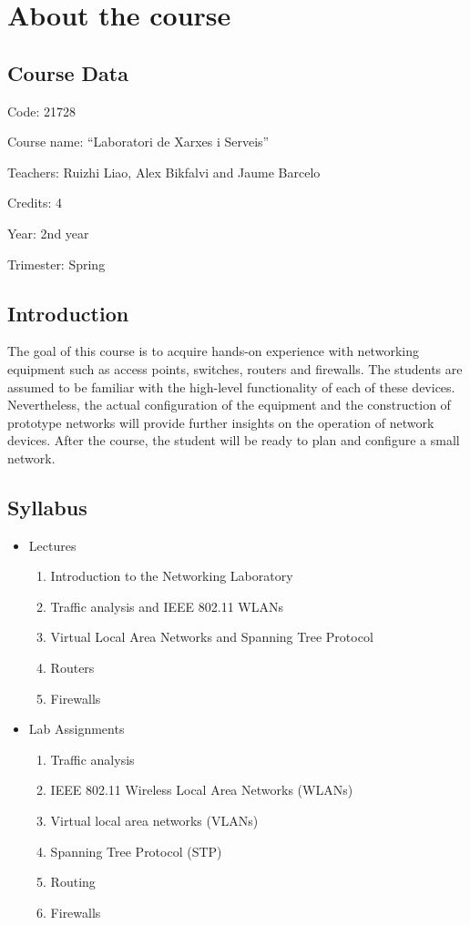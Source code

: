 \chapter{About the course}

\section{Course Data}

Code: 21728

Course name: ``Laboratori de Xarxes i Serveis''

Teachers: Ruizhi Liao, Alex Bikfalvi and Jaume Barcelo

Credits: 4

Year: 2nd year

Trimester: Spring

\section{Introduction}

The goal of this course is to acquire hands-on experience with networking equipment such as access points, switches, routers and firewalls.
The students are assumed to be familiar with the high-level functionality of each of these devices.
Nevertheless, the actual configuration of the equipment and the construction of prototype networks will provide further insights on the operation of network devices.
After the course, the student will be ready to plan and configure a small network.



\section{Syllabus}
\begin{itemize}
  \item Lectures
  \begin{enumerate}
    \item Introduction to the Networking Laboratory
    \item Traffic analysis and IEEE 802.11 WLANs
    \item Virtual Local Area Networks and Spanning Tree Protocol
    \item Routers
    \item Firewalls
  \end{enumerate}
\item Lab Assignments
  \begin{enumerate}
    \item Traffic analysis
    \item IEEE 802.11 Wireless Local Area Networks (WLANs)
    \item Virtual local area networks (VLANs)
    \item Spanning Tree Protocol (STP)
    \item Routing
    \item Firewalls
  \end{enumerate}
\end{itemize}


